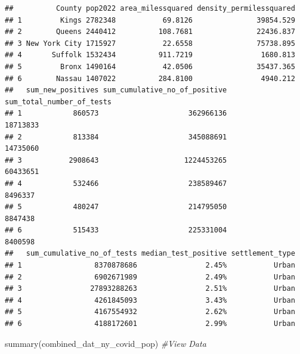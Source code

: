 \documentclass[
  12pt,
]{article}
\newenvironment{Shaded}{\begin{snugshade}}{\end{snugshade}}
\newcommand{\CommentTok}[1]{\textcolor[rgb]{0.56,0.35,0.01}{\textit{#1}}}
\newcommand{\FunctionTok}[1]{\textcolor[rgb]{0.00,0.00,0.00}{#1}}
\newcommand{\NormalTok}[1]{#1}
\begin{document}
\begin{verbatim}
##          County pop2022 area_milessquared density_permilessquared
## 1         Kings 2782348           69.8126               39854.529
## 2        Queens 2440412          108.7681               22436.837
## 3 New York City 1715927           22.6558               75738.895
## 4       Suffolk 1532434          911.7219                1680.813
## 5         Bronx 1490164           42.0506               35437.365
## 6        Nassau 1407022          284.8100                4940.212
##   sum_new_positives sum_cumulative_no_of_positive sum_total_number_of_tests
## 1            860573                     362966136                  18713833
## 2            813384                     345088691                  14735060
## 3           2908643                    1224453265                  60433651
## 4            532466                     238589467                   8496337
## 5            480247                     214795050                   8847438
## 6            515433                     225331004                   8400598
##   sum_cumulative_no_of_tests median_test_positive settlement_type
## 1                 8370878686                2.45%           Urban
## 2                 6902671989                2.49%           Urban
## 3                27893288263                2.51%           Urban
## 4                 4261845093                3.43%           Urban
## 5                 4167554932                2.62%           Urban
## 6                 4188172601                2.99%           Urban
\end{verbatim}

\begin{Shaded}
\begin{Highlighting}[]
\FunctionTok{summary}\NormalTok{(combined\_dat\_ny\_covid\_pop) }\CommentTok{\#View Data}
\end{Highlighting}
\end{Shaded}
\end{document}
